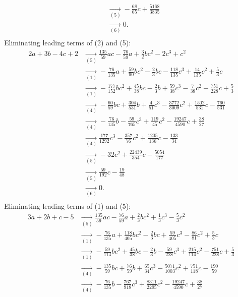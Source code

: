 {\begin{align*}
\\ &\underset{(5)}{\rightarrow}-\frac{68}{65}c+\frac{5168}{3835}
\\ &\underset{(6)}{\rightarrow}0
.\\ \end{align*}
Eliminating leading terms of (2) and (5):
\begin{align*}
2a+3b-4c+2&\underset{(5)}{\rightarrow}\frac{135}{59}ac-\frac{76}{59}a+\frac{3}{2}bc^{2}-2c^{3}+c^{2}
\\ &\underset{(1)}{\rightarrow}-\frac{76}{135}a+\frac{59}{90}bc^{2}-\frac{2}{3}bc-\frac{118}{135}c^{3}+\frac{14}{135}c^{2}+\frac{5}{3}c
\\ &\underset{(1)}{\rightarrow}-\frac{177}{152}bc^{2}+\frac{45}{38}bc-\frac{2}{3}b+\frac{59}{38}c^{3}-\frac{7}{38}c^{2}-\frac{751}{228}c+\frac{5}{3}
\\ &\underset{(4)}{\rightarrow}-\frac{60}{59}bc+\frac{304}{531}b+\frac{4}{51}c^{3}-\frac{3772}{3009}c^{2}+\frac{1502}{531}c-\frac{760}{531}
\\ &\underset{(4)}{\rightarrow}-\frac{76}{135}b-\frac{59}{765}c^{3}+\frac{119}{45}c^{2}-\frac{19247}{4590}c+\frac{38}{27}
\\ &\underset{(4)}{\rightarrow}\frac{177}{1292}c^{3}-\frac{357}{76}c^{2}+\frac{1205}{136}c-\frac{133}{34}
\\ &\underset{(5)}{\rightarrow}-32c^{2}+\frac{22439}{354}c-\frac{5054}{177}
\\ &\underset{(5)}{\rightarrow}\frac{59}{192}c-\frac{19}{48}
\\ &\underset{(6)}{\rightarrow}0
.\\ \end{align*}
Eliminating leading terms of (1) and (5):
\begin{align*}
3a+2b+c-5&\underset{(5)}{\rightarrow}\frac{135}{59}ac-\frac{76}{59}a+\frac{2}{3}bc^{2}+\frac{1}{3}c^{3}-\frac{5}{3}c^{2}
\\ &\underset{(1)}{\rightarrow}-\frac{76}{135}a+\frac{118}{405}bc^{2}-\frac{2}{3}bc+\frac{59}{405}c^{3}-\frac{86}{81}c^{2}+\frac{5}{3}c
\\ &\underset{(1)}{\rightarrow}-\frac{59}{114}bc^{2}+\frac{45}{38}bc-\frac{2}{3}b-\frac{59}{228}c^{3}+\frac{215}{114}c^{2}-\frac{751}{228}c+\frac{5}{3}
\\ &\underset{(4)}{\rightarrow}-\frac{135}{59}bc+\frac{76}{59}b+\frac{65}{34}c^{3}-\frac{5071}{1003}c^{2}+\frac{751}{118}c-\frac{190}{59}
\\ &\underset{(4)}{\rightarrow}-\frac{76}{135}b-\frac{767}{918}c^{3}+\frac{8311}{2295}c^{2}-\frac{19247}{4590}c+\frac{38}{27}

\end{align*}}
